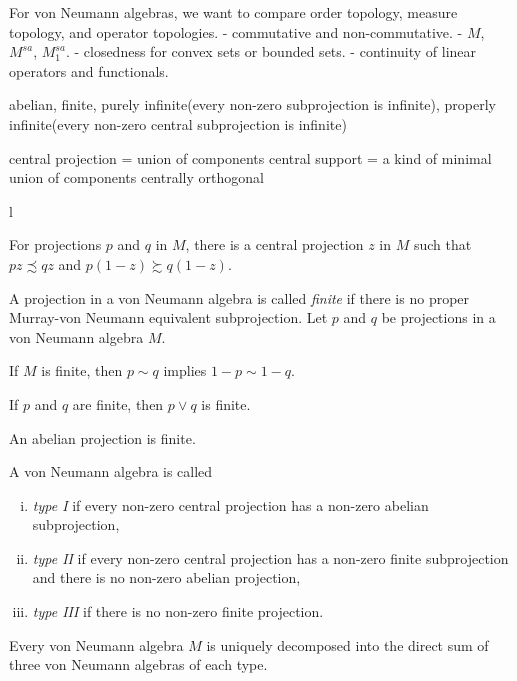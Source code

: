 \documentclass{../../large}
\begin{document}
For von Neumann algebras, we want to compare order topology, measure topology, and operator topologies.
- commutative and non-commutative.
- $M$, $M^{sa}$, $M_1^{sa}$.
- closedness for convex sets or bounded sets.
- continuity of linear operators and functionals.




abelian, finite, purely infinite(every non-zero subprojection is infinite), properly infinite(every non-zero central subprojection is infinite)

central projection = union of components
central support = a kind of minimal union of components
centrally orthogonal


\begin{prb}
l
\begin{parts}
\item For projections $p$ and $q$ in $M$, there is a central projection $z$ in $M$ such that $pz\precsim qz$ and $p(1-z)\succsim q(1-z)$.
\end{parts}
\end{prb}

\begin{prb}
A projection in a von Neumann algebra is called \emph{finite} if there is no proper Murray-von Neumann equivalent subprojection.
Let $p$ and $q$ be projections in a von Neumann algebra $M$.
\begin{parts}
\item If $M$ is finite, then $p\sim q$ implies $1-p\sim 1-q$.
\item If $p$ and $q$ are finite, then $p\vee q$ is finite.
\item An abelian projection is finite.
\end{parts}
\end{prb}


\begin{prb}
A von Neumann algebra is called
\begin{enumerate}[(i)]
\item \emph{type I} if every non-zero central projection has a non-zero abelian subprojection,
\item \emph{type II} if every non-zero central projection has a non-zero finite subprojection and there is no non-zero abelian projection,
\item \emph{type III} if there is no non-zero finite projection.
\end{enumerate}
\begin{parts}
\item Every von Neumann algebra $M$ is uniquely decomposed into the direct sum of three von Neumann algebras of each type.
\end{parts}
\end{prb}
\end{document}
